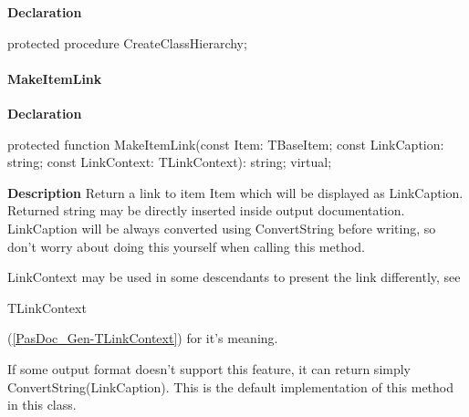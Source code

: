 \documentclass{report}
\newif\ifpdf
\begin{document}
\label{PasDoc_Gen.TDocGenerator-CreateClassHierarchy}
\begin{list}{}{
\setlength{\itemindent}{0cm}
\setlength{\listparindent}{0cm}
\setlength{\leftmargin}{\evensidemargin}
\addtolength{\leftmargin}{\tmplength}
\settowidth{\labelsep}{X}
\addtolength{\leftmargin}{\labelsep}
\setlength{\labelwidth}{\tmplength}
}
\item[\textbf{Declaration}\hfill]
\ifpdf
\begin{flushleft}
\fi
\begin{ttfamily}
protected procedure CreateClassHierarchy;\end{ttfamily}

\ifpdf
\end{flushleft}
\fi

\end{list}
\paragraph*{MakeItemLink}\hspace*{\fill}

\label{PasDoc_Gen.TDocGenerator-MakeItemLink}
\begin{list}{}{
\setlength{\itemindent}{0cm}
\setlength{\listparindent}{0cm}
\setlength{\leftmargin}{\evensidemargin}
\addtolength{\leftmargin}{\tmplength}
\settowidth{\labelsep}{X}
\addtolength{\leftmargin}{\labelsep}
\setlength{\labelwidth}{\tmplength}
}
\item[\textbf{Declaration}\hfill]
\ifpdf
\begin{flushleft}
\fi
\begin{ttfamily}
protected function MakeItemLink(const Item: TBaseItem; const LinkCaption: string; const LinkContext: TLinkContext): string; virtual;\end{ttfamily}

\ifpdf
\end{flushleft}
\fi

\par
\item[\textbf{Description}]
Return a link to item Item which will be displayed as LinkCaption. Returned string may be directly inserted inside output documentation. LinkCaption will be always converted using ConvertString before writing, so don't worry about doing this yourself when calling this method.

LinkContext may be used in some descendants to present the link differently, see \begin{ttfamily}TLinkContext\end{ttfamily}(\ref{PasDoc_Gen-TLinkContext}) for it's meaning.

If some output format doesn't support this feature, it can return simply ConvertString(LinkCaption). This is the default implementation of this method in this class.

\end{list}
\end{document}
